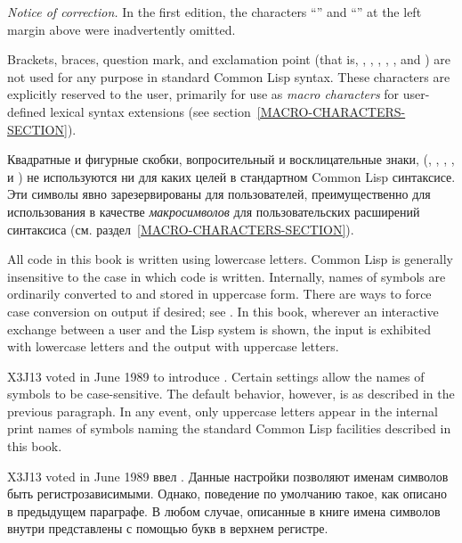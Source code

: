 
\begin{new}%
\textit{Notice of correction.}
In the first edition, the characters ``\cd{,}'' and ``\cd{:}'' at the
left margin above were inadvertently omitted.
\end{new}

Brackets, braces, question mark, and exclamation point
(that is, \cd{{\Xlbracket}}, \cd{{\Xrbracket}}, \cd{{\Xlbrace}}, \cd{{\Xrbrace}},
, and \cd{!}) are not used for any purpose in standard Common Lisp syntax.
These characters are explicitly reserved to the user, primarily
for use as \textit{macro characters} for user-defined lexical syntax extensions
(see section~\ref{MACRO-CHARACTERS-SECTION}).

Квадратные и фигурные скобки, вопросительный и восклицательные знаки, (\cd{{\Xlbracket}}, \cd{{\Xrbracket}}, \cd{{\Xlbrace}}, \cd{{\Xrbrace}},
 и  \cd{!}) не используются ни для каких целей в стандартном Common Lisp
синтаксисе. Эти символы явно зарезервированы для пользователей, преимущественно
для использования в качестве \textit{макросимволов} для пользовательских расширений
синтаксиса (см. раздел~\ref{MACRO-CHARACTERS-SECTION}).

\begin{obsolete}
All code in this book is written using lowercase letters.
Common Lisp is generally insensitive to the case in which code
is written.  Internally, names of symbols are ordinarily
converted to and stored in uppercase form.
There are ways to force case conversion on output if desired;
see .
In this book, wherever an interactive exchange between a user
and the Lisp system is shown, the input is exhibited with lowercase
letters and the output with uppercase letters.
\end{obsolete}

\begin{newer}
X3J13 voted in June 1989  to introduce
.  Certain settings allow the names of symbols
to be case-sensitive.  The default behavior, however, is as described
in the previous paragraph.  In any event, only uppercase letters
appear in the internal print names of symbols naming the
standard Common Lisp facilities described in this book.

X3J13 voted in June 1989 
ввел . Данные настройки позволяют именам символов быть
регистрозависимыми. Однако, поведение по умолчанию такое, как описано в
предыдущем параграфе. В любом случае, описанные в книге имена символов внутри
представлены с помощью букв в верхнем регистре.
\end{newer}
